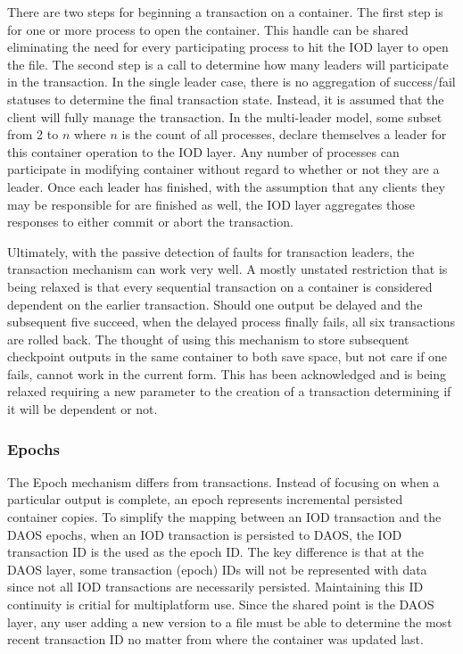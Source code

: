 \documentclass[conference]{IEEEtran}
\begin{document}
There are two steps for beginning a transaction on a container. The first step
is for one or more process to open the container. This handle can be shared
eliminating the need for every participating process to hit the IOD layer to
open the file. The second step is a call to determine how many leaders will
participate in the transaction. In the single leader case, there is no
aggregation of success/fail statuses to determine the final transaction state.
Instead, it is assumed that the client will fully manage the transaction. In
the multi-leader model, some subset from 2 to $n$ where $n$ is the count of all
processes, declare themselves a leader for this container operation to the IOD
layer. Any number of processes can participate in modifying container without
regard to whether or not they are a leader. Once each leader has finished, with
the assumption that any clients they may be responsible for are finished as
well, the IOD layer aggregates those responses to either commit or abort the
transaction.

Ultimately, with the passive detection of faults for transaction leaders, the
transaction mechanism can work very well. A mostly unstated restriction that is
being relaxed is that every sequential transaction on a container is considered
dependent on the earlier transaction. Should one output be delayed and the
subsequent five succeed, when the delayed process finally fails, all six
transactions are rolled back. The thought of using this mechanism to store
subsequent checkpoint outputs in the same container to both save space, but not
care if one fails, cannot work in the current form. This has been acknowledged
and is being relaxed requiring a new parameter to the creation of a transaction
determining if it will be dependent or not.

\subsubsection{Epochs}
The Epoch mechanism differs from transactions. Instead of focusing on when a
particular output is complete, an epoch represents incremental persisted
container copies.  To simplify the mapping between an IOD transaction and the
DAOS epochs, when an IOD transaction is persisted to DAOS, the IOD transaction
ID is the used as the epoch ID. The key difference is that at the DAOS layer,
some transaction (epoch) IDs will not be represented with data since not all
IOD transactions are necessarily persisted. Maintaining this ID continuity is
critial for multiplatform use. Since the shared point is the DAOS layer, any
user adding a new version to a file must be able to determine the most recent
transaction ID no matter from where the container was updated last.
\end{document}

